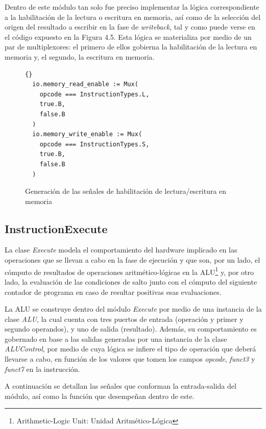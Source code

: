 Dentro de este módulo tan solo fue preciso implementar la lógica correspondiente a la habilitación de la lectura o escritura en memoria, así como de la selección del origen del resultado a escribir en la fase de \textit{writeback}, tal y como puede verse en el código expuesto en la Figura 4.5. Esta lógica se materializa por medio de un par de multiplexores: el primero de ellos gobierna la habilitación de la lectura en memoria y, el segundo, la escritura en memoria.

\begin{figure}[h]
\begin{lstlisting}[style=scalaStyle]{}
  io.memory_read_enable := Mux(
    opcode === InstructionTypes.L,
    true.B,
    false.B
  )
  io.memory_write_enable := Mux(
    opcode === InstructionTypes.S,
    true.B,
    false.B
  )
\end{lstlisting}
\vspace{-0.4cm}
\caption{Generación de las señales de habilitación de lectura/escritura en memoria}
\end{figure}

\subsection{InstructionExecute}

La clase \textit{Execute} modela el comportamiento del hardware implicado en las operaciones que se llevan a cabo en la fase de ejecución y que son, por un lado, el cómputo de resultados de operaciones aritmético-lógicas en la ALU\footnote{Arithmetic-Logic Unit: Unidad Aritmético-Lógica} y, por otro lado, la evaluación de las condiciones de salto junto con el cómputo del siguiente contador de programa en caso de resultar positivas esas evaluaciones.

La ALU se construye dentro del módulo \textit{Execute} por medio de una instancia de la clase \textit{ALU}, la cual cuenta con tres puertos de entrada (operación y primer y segundo operandos), y uno de salida (resultado). Además, su comportamiento es gobernado en base a las salidas generadas por una instancia de la clase \textit{ALUControl}, por medio de cuya lógica se infiere el tipo de operación que deberá llevarse a cabo, en función de los valores que tomen los campos \textit{opcode}, \textit{funct3} y \textit{funct7} en la instrucción.

A continuación se detallan las señales que conforman la entrada-salida del módulo, así como la función que desempeñan dentro de este.

